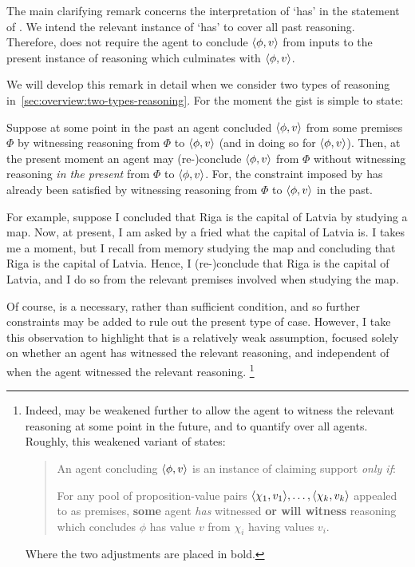 \begin{note}
  The main clarifying remark concerns the interpretation of `has' in the statement of \ESU{}.
  We intend the relevant instance of `has' to cover all past reasoning.
  Therefore, \ESU{} does not require the agent to conclude \(\langle \phi, v \rangle\) from inputs to the present instance of reasoning which culminates with \(\langle \phi, v \rangle\).

  We will develop this remark in detail when we consider two types of reasoning in~\autoref{sec:overview:two-types-reasoning}.
  For the moment the gist is simple to state:

  Suppose at some point in the past an agent concluded \(\langle \phi, v \rangle\) from some premises \(\Phi\) by witnessing reasoning from \(\Phi\) to \(\langle \phi, v \rangle\) (and in doing so \csVed{} for \(\langle \phi, v \rangle\)).
  Then, at the present moment an agent may (re-)conclude \(\langle \phi, v \rangle\) from \(\Phi\) without witnessing reasoning \emph{in the present} from \(\Phi\) to \(\langle \phi, v \rangle\).
  For, the constraint imposed by \ESU{} has already been satisfied by witnessing reasoning from \(\Phi\) to \(\langle \phi, v \rangle\) in the past.

  For example, suppose I concluded that Riga is the capital of Latvia by studying a map.
  Now, at present, I am asked by a fried what the capital of Latvia is.
  I takes me a moment, but I recall from memory studying the map and concluding that Riga is the capital of Latvia.
  Hence, I (re-)conclude that Riga is the capital of Latvia, and I do so from the relevant premises involved when studying the map.

  Of course, \ESU{} is a necessary, rather than sufficient condition, and so further constraints may be added to rule out the present type of case.
  However, I take this observation to highlight that \ESU{} is a relatively weak assumption, focused solely on whether an agent has witnessed the relevant reasoning, and independent of when the agent witnessed the relevant reasoning.%
  \footnote{
    \label{ft:weak-esu}
    Indeed, \ESU{} may be weakened further to allow the agent to witness the relevant reasoning at some point in the future, and to quantify over all agents.
    Roughly, this weakened variant of \ESU{} states:
    \begin{quote}
      An agent concluding \(\langle \phi, v \rangle\) is an instance of claiming support \emph{only if}:

      For any pool of proposition-value pairs \(\langle \chi_{1}, v_{1} \rangle,\dots,\langle \chi_{k}, v_{k} \rangle\) appealed to as premises, \textbf{some} agent \emph{has} witnessed \textbf{or will witness} reasoning which concludes \(\phi\) has value \(v\) from \(\chi_{i}\) having values \(v_{i}\).
    \end{quote}
    Where the two adjustments are placed in bold.

}
\end{note}
